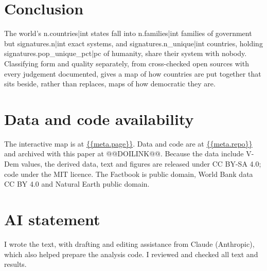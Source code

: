 \documentclass[11pt,a4paper]{article}
\begin{document}
\section{Conclusion}
The world's {{n.countries|int}} states fall into {{n.families|int}} families of government but {{signatures.n|int}} exact systems, and {{signatures.n_unique|int}} countries, holding {{signatures.pop_unique_pct|pc}} of humanity, share their system with nobody. Classifying form and quality separately, from cross-checked open sources with every judgement documented, gives a map of how countries are put together that sits beside, rather than replaces, maps of how democratic they are.

\section*{Data and code availability}
The interactive map is at \url{{{meta.page}}}. Data and code are at \url{{{meta.repo}}} and archived with this paper at @@DOILINK@@. Because the data include V-Dem values, the derived data, text and figures are released under CC BY-SA 4.0; code under the MIT licence. The Factbook is public domain, World Bank data CC BY 4.0 and Natural Earth public domain.

\section*{AI statement}
I wrote the text, with drafting and editing assistance from Claude (Anthropic), which also helped prepare the analysis code. I reviewed and checked all text and results.
\end{document}
